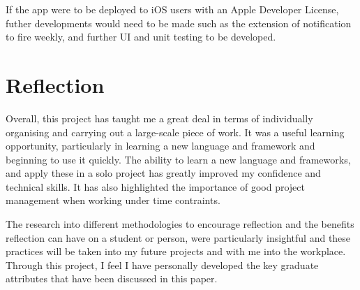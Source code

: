 \documentclass{l4proj}
\begin{document}
If the app were to be deployed to iOS users with an Apple Developer License, futher developments would need to be made such as the extension of notification to fire weekly, and further UI and unit testing to be developed. 


\section{Reflection}

Overall, this project has taught me a great deal in terms of individually organising and carrying out a large-scale piece of work. It was a useful learning opportunity, particularly in learning a new language and framework and beginning to use it quickly. The ability to learn a new language and frameworks, and apply these in a solo project has greatly improved my confidence and technical skills. It has also highlighted the importance of good project management when working under time contraints. 

The research into different methodologies to encourage reflection and the benefits reflection can have on a student or person, were particularly insightful and these practices will be taken into my future projects and with me into the workplace. Through this project, I feel I have personally developed the key graduate attributes that have been discussed in this paper.


%
% 
\end{document}
